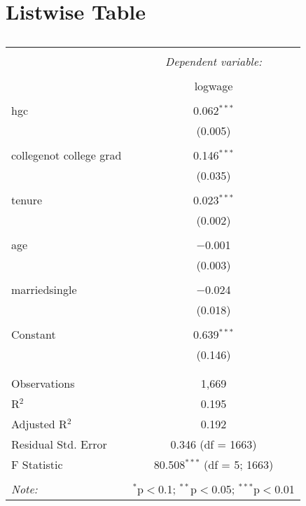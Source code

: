 \documentclass{article}
\begin{document}
\section{Listwise Table}
\begin{table}[!htbp] \centering 
  \caption{} 
  \label{} 
\begin{tabular}{@{\extracolsep{5pt}}lc} 
\\[-1.8ex]\hline 
\hline \\[-1.8ex] 
 & \multicolumn{1}{c}{\textit{Dependent variable:}} \\ 
\cline{2-2} 
\\[-1.8ex] & logwage \\ 
\hline \\[-1.8ex] 
 hgc & 0.062$^{***}$ \\ 
  & (0.005) \\ 
  & \\ 
 collegenot college grad & 0.146$^{***}$ \\ 
  & (0.035) \\ 
  & \\ 
 tenure & 0.023$^{***}$ \\ 
  & (0.002) \\ 
  & \\ 
 age & $-$0.001 \\ 
  & (0.003) \\ 
  & \\ 
 marriedsingle & $-$0.024 \\ 
  & (0.018) \\ 
  & \\ 
 Constant & 0.639$^{***}$ \\ 
  & (0.146) \\ 
  & \\ 
\hline \\[-1.8ex] 
Observations & 1,669 \\ 
R$^{2}$ & 0.195 \\ 
Adjusted R$^{2}$ & 0.192 \\ 
Residual Std. Error & 0.346 (df = 1663) \\ 
F Statistic & 80.508$^{***}$ (df = 5; 1663) \\ 
\hline 
\hline \\[-1.8ex] 
\textit{Note:}  & \multicolumn{1}{r}{$^{*}$p$<$0.1; $^{**}$p$<$0.05; $^{***}$p$<$0.01} \\ 
\end{tabular} 
\end{table} 
\end{document}
